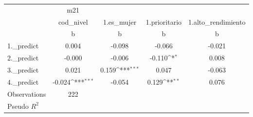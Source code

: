 {
\def\sym#1{\ifmmode^{#1}\else\(^{#1}\)\fi}
\begin{tabular}{l*{4}{c}}
\toprule
                &      m21         &                  &                  &                  \\
                &cod\_nivel         &1.es\_mujer         &1.prioritario         &1.alto\_rendimiento         \\
                &        b         &        b         &        b         &        b         \\
\midrule
1.\_predict      &    0.004         &   -0.098         &   -0.066         &   -0.021         \\
2.\_predict      &   -0.000         &   -0.006         &   -0.110\sym{*}  &    0.008         \\
3.\_predict      &    0.021         &    0.159\sym{***}&    0.047         &   -0.063         \\
4.\_predict      &   -0.024\sym{***}&   -0.054         &    0.129\sym{**} &    0.076         \\
\midrule
Observations    &      222         &                  &                  &                  \\
Pseudo \(R^{2}\)&                  &                  &                  &                  \\
\bottomrule
\end{tabular}
}

